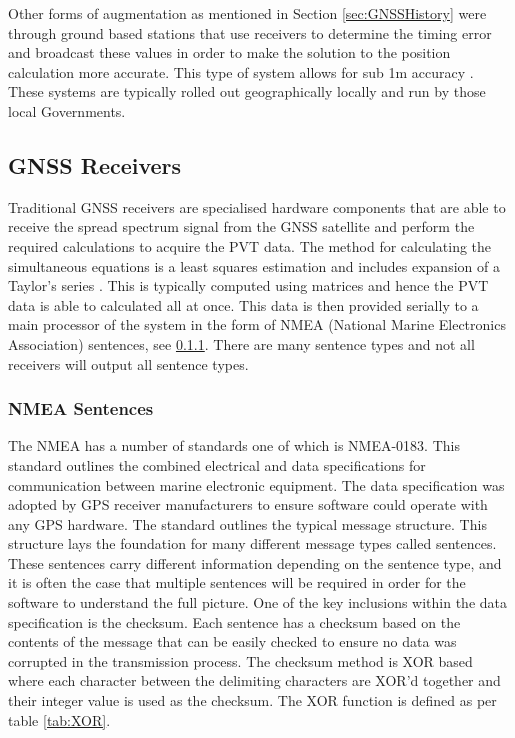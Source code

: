 Other forms of augmentation as mentioned in Section \ref{sec:GNSSHistory} were through ground based stations that use receivers to determine the timing error and broadcast these
values in order to make the solution to the position calculation more accurate. This type of system allows for sub 1m accuracy \cite{RN73}. These systems are typically rolled out
geographically locally and run by those local Governments.

\subsection{GNSS Receivers}
Traditional GNSS receivers are specialised hardware components that are able to receive the spread spectrum signal from the GNSS satellite and perform the required
calculations to acquire the PVT data. The method for calculating the simultaneous equations is a least squares estimation and includes expansion of a Taylor's series \cite{RN46}.
This is typically computed using matrices and hence the PVT data is able to calculated all at once.
This data is then provided serially to a main processor of the system in the form of NMEA (National Marine Electronics Association)
sentences, see \ref{subsubsec:NMEA}. There are many sentence types
and not all receivers will output all sentence types.

\subsubsection{NMEA Sentences} \label{subsubsec:NMEA}
The NMEA has a number of standards one of which is NMEA-0183. This standard outlines the combined electrical and data
specifications for communication between marine electronic equipment. The data specification was adopted by GPS receiver manufacturers to ensure software could operate
with any GPS hardware. The standard outlines the typical message structure. This structure lays the foundation for many different message types called sentences. These
sentences carry different information depending on the sentence type, and it is often the case that multiple sentences will be required in order for the software to
understand the full picture. One of the key inclusions within the data specification is the checksum. Each sentence has a checksum based on the contents of the message
that can be easily checked to ensure no data was corrupted in the transmission process. The checksum method is XOR based where each character between the delimiting
characters are XOR'd together and their integer value is used as the checksum. The XOR function is defined as per table \ref{tab:XOR}.


